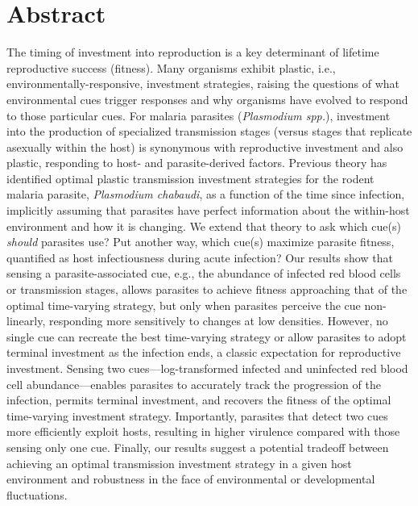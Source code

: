 \documentclass[10pt,letterpaper]{article}
\begin{document}
\section*{Abstract}
The timing of investment into reproduction is a key determinant of lifetime reproductive success (fitness). Many organisms exhibit plastic, i.e., environmentally-responsive, investment strategies, raising the questions of what environmental cues trigger responses and why organisms have evolved to respond to those particular cues. For malaria parasites (\emph{Plasmodium spp.}), investment into the production of specialized transmission stages (versus stages that replicate asexually within the host) is synonymous with reproductive investment and also plastic, responding to host- and parasite-derived factors. Previous theory has identified optimal plastic transmission investment strategies for the rodent malaria parasite, \textit{Plasmodium chabaudi}, as a function of the time since infection, implicitly assuming that parasites have perfect information about the within-host environment and how it is changing. We extend that theory to ask which cue(s) \textit{should} parasites use? Put another way, which cue(s) maximize parasite fitness, quantified as host infectiousness during acute infection? Our results show that sensing a parasite-associated cue, e.g., the abundance of infected red blood cells or transmission stages, allows parasites to achieve fitness approaching that of the optimal time-varying strategy, but only when parasites perceive the cue non-linearly, responding more sensitively to changes at low densities. However, no single cue can recreate the best time-varying strategy or allow parasites to adopt terminal investment as the infection ends, a classic expectation for reproductive investment. Sensing two cues---log-transformed infected and uninfected red blood cell abundance---enables parasites to accurately track the progression of the infection, permits terminal investment, and recovers the fitness of the optimal time-varying investment strategy. Importantly, parasites that detect two cues more efficiently exploit hosts, resulting in higher virulence compared with those sensing only one cue. Finally, our results suggest a potential tradeoff between achieving an optimal transmission investment strategy in a given host environment and robustness in the face of environmental or developmental fluctuations.

\linenumbers
\end{document}
